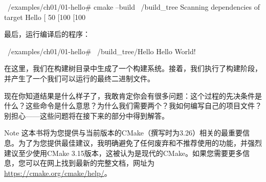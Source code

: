 \begin{shell}
~/examples/ch01/01-hello# cmake --build ~/build_tree
Scanning dependencies of target Hello
[ 50%
[100%
[100%
\end{shell}

最后，运行编译后的程序：

\begin{shell}
~/examples/ch01/01-hello# ~/build_tree/Hello
Hello World!
\end{shell}

在这里，我们在构建树目录中生成了一个构建系统。接着，我们执行了构建阶段，并产生了一个我们可以运行的最终二进制文件。

现在你知道结果是什么样子了，我敢肯定你会有很多问题：这个过程的先决条件是什么？这些命令是什么意思？为什么我们需要两个？我如何编写自己的项目文件？别担心——这些问题将在接下来的部分中得到解答。

\begin{myNotic}{Note}
这本书将为您提供与当前版本的CMake（撰写时为3.26）相关的最重要信息。为了为您提供最佳建议，我明确避免了任何废弃和不推荐使用的功能，并强烈建议至少使用CMake 3.15版本，这被认为是现代的CMake。如果您需要更多信息，您可以在网上找到最新的完整文档，网址为 \url{https://cmake.org/cmake/help/}。
\end{myNotic}
















